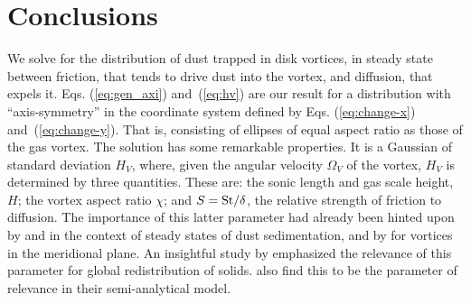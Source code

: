 \documentclass[apj]{emulateapj}
\def\blue#1{\textcolor{blue}{ #1}}
\newcommand{\Eqs}[2]{Eqs. (\ref{#1}) and~(\ref{#2})}
\newcommand{\eqs}[2]{\Eqs{#1}{#2}}
\newcommand{\beq}{\begin{equation}}
\newcommand{\eeq}{\end{equation}}
\newcommand{\St}{{\rm St}}
\begin{document}











\section{Conclusions}

We solve for the distribution of dust trapped in
disk vortices, in steady state between friction, that 
tends to drive dust into the vortex, and diffusion, that expels
it. \eqs{eq:gen_axi}{eq:hv} are our result for a distribution with
``axis-symmetry''  in the coordinate system defined by
\eqs{eq:change-x}{eq:change-y}. That is, consisting of ellipses of
equal aspect ratio as those of the gas vortex. The solution has some remarkable
properties. It is a Gaussian of standard deviation $H_V$, where, given
the angular velocity $\varOmega_V$ of the vortex, $H_V$
is determined by three quantities. These are: 
the sonic length and gas scale height, $H$; the vortex aspect ratio
$\chi$; and \blue{$S=\St/\delta$}, the relative strength of friction to
diffusion. The importance of this latter parameter had already been 
hinted upon by \citet{Cuzzi93} and \citet{Dubrulle95} 
in the context of steady states of dust sedimentation, and by
\citet{Klahr-Henning97} for vortices in the meridional plane. An insightful study by 
\citet{Jacquet12} emphasized the relevance of this parameter for 
global redistribution of solids. \citet{Birnstiel13} also find this to be 
the parameter of relevance in their semi-analytical model.
\end{document}
